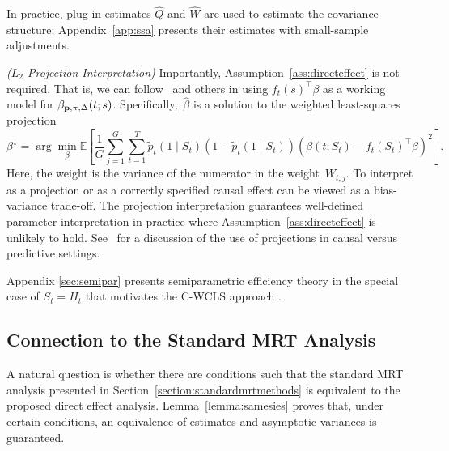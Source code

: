 \documentclass[lineno]{biometrika}
\begin{document}
\noindent In practice, plug-in estimates $\hat Q$ and $\hat W$ are used to estimate the covariance structure; Appendix~\ref{app:ssa} presents their estimates with small-sample adjustments.


\begin{remark}{\it ($L_2$ Projection Interpretation)}
\label{rmk:l2proj}
Importantly, Assumption~\ref{ass:directeffect} is not required.  That is, we can follow~\cite{Neugebauer2007,Rosenblum2010,Kennedy2019,DempseyAOAS} and others in using $f_t (s)^\top \beta$ as a working model for $\beta_{{\bf p}, \pi, \Delta} (t;s)$.  Specifically,~$\hat \beta$ is a solution to the weighted least-squares projection
$$
\beta^\star = \arg \min_{\beta} \mathbb{E} \left[ \frac{1}{G} \sum_{j=1}^G \sum_{t=1}^T \tilde p_t(1 \mid S_t) \left( 1 - \tilde p_t(1 \mid S_t) \right) \left( \beta(t; S_t) - f_t (S_t)^\top \beta \right)^2 \right].
$$
Here, the weight is the variance of the numerator in the weight~$W_{t,j}$.  To interpret as a projection or as a correctly specified causal effect can be viewed as a bias-variance trade-off. The projection interpretation guarantees well-defined parameter interpretation in practice where Assumption~\ref{ass:directeffect} is unlikely to hold.  See~\citet[Sec. 3.1, pp.9--10][]{Kennedy2019} for a discussion of the use of projections in causal versus predictive settings.
\end{remark}

Appendix \ref{sec:semipar} presents semiparametric efficiency theory in the special case of $S_t = H_t$ that motivates the C-WCLS approach . 

\subsection{Connection to the Standard MRT Analysis}
\label{section:samesies}
A natural question is whether there are conditions such that the standard MRT analysis presented in Section~\ref{section:standardmrtmethods} is equivalent to the proposed direct effect analysis.  
Lemma~\ref{lemma:samesies} proves that, under certain conditions, an equivalence of estimates and asymptotic variances is guaranteed.
\end{document}
